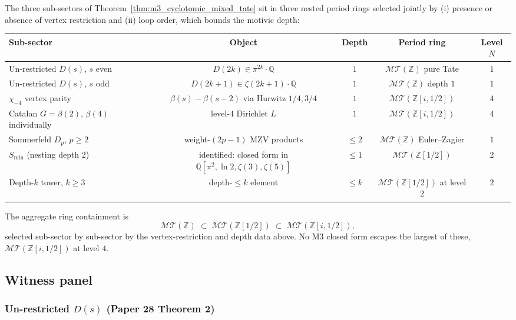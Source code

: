 \documentclass[11pt,a4paper]{article}
\theoremstyle{plain}
\theoremstyle{definition}
\newcommand{\Z}{\mathbb{Z}}
\newcommand{\Q}{\mathbb{Q}}
\newcommand{\MT}{\mathcal{MT}}
\begin{document}
The three sub-sectors of Theorem~\ref{thm:m3_cyclotomic_mixed_tate}
sit in three nested period rings selected jointly by (i) presence
or absence of vertex restriction and (ii) loop order, which bounds
the motivic depth:

\begin{center}
\renewcommand{\arraystretch}{1.15}
\begin{tabular}{@{}lcccc@{}}
\toprule
Sub-sector & Object & Depth & Period ring & Level $N$ \\
\midrule
Un-restricted $D(s)$, $s$ even & $D(2k) \in \pi^{2k}\cdot\Q$ & $1$ & $\MT(\Z)$ pure Tate & $1$ \\
Un-restricted $D(s)$, $s$ odd & $D(2k+1) \in \zeta(2k+1)\cdot\Q$ & $1$ & $\MT(\Z)$ depth $1$ & $1$ \\
$\chi_{-4}$ vertex parity & $\beta(s) - \beta(s-2)$ via Hurwitz $1/4, 3/4$ & $1$ & $\MT(\Z[i, 1/2])$ & $4$ \\
Catalan $G = \beta(2)$, $\beta(4)$ individually & level-$4$ Dirichlet $L$ & $1$ & $\MT(\Z[i, 1/2])$ & $4$ \\
Sommerfeld $D_p$, $p \ge 2$ & weight-$(2p-1)$ MZV products & $\le 2$ & $\MT(\Z)$ Euler--Zagier & $1$ \\
$S_{\min}$ (nesting depth $2$) & identified: closed form in $\Q[\pi^2, \ln 2, \zeta(3), \zeta(5)]$ & $\le 1$ & $\MT(\Z[1/2])$ & $2$ \\
Depth-$k$ tower, $k \ge 3$ & depth-$\le k$ element & $\le k$ & $\MT(\Z[1/2])$ at level $2$ & $2$ \\
\bottomrule
\end{tabular}
\end{center}

The aggregate ring containment is
\begin{equation}
\label{eq:m3_nested}
\MT(\Z) \;\subset\; \MT(\Z[1/2]) \;\subset\; \MT(\Z[i, 1/2]),
\end{equation}
selected sub-sector by sub-sector by the vertex-restriction and depth
data above.  No M3 closed form escapes the largest of these,
$\MT(\Z[i, 1/2])$ at level $4$.

\subsection{Witness panel}

\subsubsection{Un-restricted $D(s)$ (Paper 28 Theorem 2)}
\end{document}
